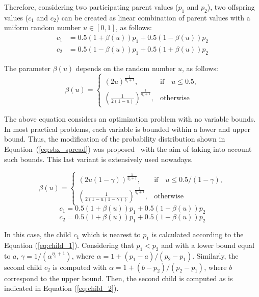 Therefore, considering two participating parent values ($p_1$ and $p_2$), two offspring values ($c_1$ and $c_2$) can be created as linear combination of parent values with a uniform random number $u \in [0, 1]$, as follows:
\begin{equation} 
\begin{split}
c_1 &= 0.5(1 + \beta(u))p_1 + 0.5(1 - \beta(u)) p_2 \\
c_2 &= 0.5(1 - \beta(u))p_1 + 0.5(1 + \beta(u)) p_2
\end{split}
\end{equation}

The parameter $\beta(u)$ depends on the random number $u$, as follows:
\begin{equation}
    \beta(u)= 
\begin{cases}
     (2u)^{\frac{1}{\eta_c+1}},& \text{if} \quad u \leq 0.5,\\
     	(\frac{1}{2(1-u)})^{\frac{1}{\eta_c +1}} ,& \text{otherwise}
\end{cases}
\end{equation}

The above equation considers an optimization problem with no variable bounds.
%
In most practical problems, each variable is bounded within a lower and upper bound.
%
Thus, the modification of the probability distribution shown in Equation~(\ref{eq:sbx_spread}) 
was proposed~\cite{deb1999self} with the aim of taking into account such bounds.
%
This last variant is extensively used nowadays.

%
\begin{equation} \label{eq:sbx_spread}
    \beta(u)= 
\begin{cases}
     (2u(1-\gamma))^{\frac{1}{\eta_c+1}},& \text{if} \quad u \leq 0.5/(1-\gamma),\\
     	(\frac{1}{2(1-u(1-\gamma))})^{\frac{1}{\eta_c +1}} ,& \text{otherwise}
\end{cases}
\end{equation}
\begin{equation} \label{eq:child_1}
c_1 = 0.5(1 + \beta(u))p_1 + 0.5(1-\beta(u))p_2
\end{equation}
\begin{equation} \label{eq:child_2}
c_2 = 0.5(1 + \beta(u))p_1 + 0.5(1-\beta(u))p_2
\end{equation}

In this case, the child $c_1$ which is nearest to $p_1$ is calculated according to the Equation (\ref{eq:child_1}).
%
Considering that $p_1 < p_2$ and with a lower bound equal to $a$, $\gamma = 1/(\alpha^{\eta_c + 1})$, where $\alpha = 1 + (p_1 - a) / (p_2 - p_1)$.
%
Similarly, the second child $c_2$ is computed with $\alpha = 1 + (b-p_2)/(p_2 - p_1)$, where $b$ correspond to the upper bound.
%
Then, the second child is computed as is indicated in Equation (\ref{eq:child_2}).

